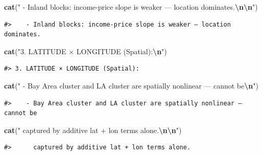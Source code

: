 \documentclass[
]{article}
\newenvironment{Shaded}{\begin{snugshade}}{\end{snugshade}}
\newcommand{\FunctionTok}[1]{\textcolor[rgb]{0.13,0.29,0.53}{\textbf{#1}}}
\newcommand{\NormalTok}[1]{#1}
\newcommand{\SpecialCharTok}[1]{\textcolor[rgb]{0.81,0.36,0.00}{\textbf{#1}}}
\newcommand{\StringTok}[1]{\textcolor[rgb]{0.31,0.60,0.02}{#1}}
\begin{document}
\begin{Shaded}
\begin{Highlighting}[]
\FunctionTok{cat}\NormalTok{(}\StringTok{"   {-} Inland blocks: income{-}price slope is weaker — location dominates.}\SpecialCharTok{\textbackslash{}n\textbackslash{}n}\StringTok{"}\NormalTok{)}
\end{Highlighting}
\end{Shaded}

\begin{verbatim}
#>    - Inland blocks: income-price slope is weaker — location dominates.
\end{verbatim}

\begin{Shaded}
\begin{Highlighting}[]
\FunctionTok{cat}\NormalTok{(}\StringTok{"3. LATITUDE × LONGITUDE (Spatial):}\SpecialCharTok{\textbackslash{}n}\StringTok{"}\NormalTok{)}
\end{Highlighting}
\end{Shaded}

\begin{verbatim}
#> 3. LATITUDE × LONGITUDE (Spatial):
\end{verbatim}

\begin{Shaded}
\begin{Highlighting}[]
\FunctionTok{cat}\NormalTok{(}\StringTok{"   {-} Bay Area cluster and LA cluster are spatially nonlinear — cannot be}\SpecialCharTok{\textbackslash{}n}\StringTok{"}\NormalTok{)}
\end{Highlighting}
\end{Shaded}

\begin{verbatim}
#>    - Bay Area cluster and LA cluster are spatially nonlinear — cannot be
\end{verbatim}

\begin{Shaded}
\begin{Highlighting}[]
\FunctionTok{cat}\NormalTok{(}\StringTok{"     captured by additive lat + lon terms alone.}\SpecialCharTok{\textbackslash{}n\textbackslash{}n}\StringTok{"}\NormalTok{)}
\end{Highlighting}
\end{Shaded}

\begin{verbatim}
#>      captured by additive lat + lon terms alone.
\end{verbatim}
\end{document}
